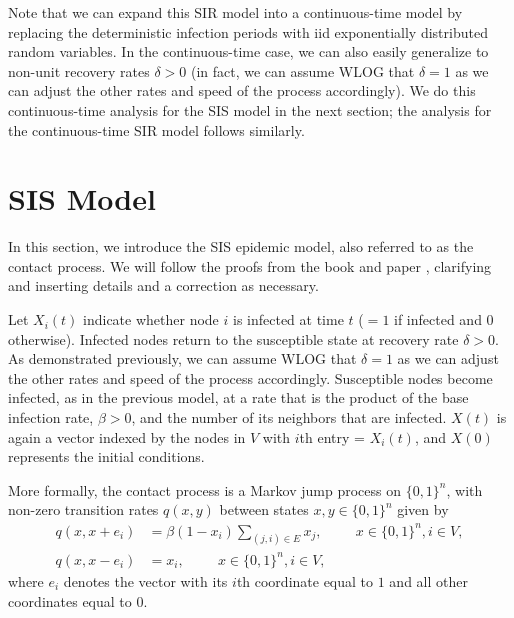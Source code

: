 \documentclass[11pt]{article}
\begin{document}

Note that we can expand this SIR model into a continuous-time model by replacing the deterministic infection periods with iid exponentially distributed random variables. In the continuous-time case, we can also easily generalize to non-unit recovery rates $\delta>0$ (in fact, we can assume WLOG that $\delta=1$ as we can adjust the other rates and speed of the process accordingly). We do this continuous-time analysis for the SIS model in the next section; the analysis for the continuous-time SIR model follows similarly.




\section{SIS Model} \label{sec:SIS}

In this section, we introduce the SIS epidemic model, also referred to as the contact process. We will follow the proofs from the book \cite{draief:epidemics} and paper \cite{ganesh:SIS_paper}, clarifying and inserting details and a correction as necessary.

Let $X_i(t)$ indicate whether node $i$ is infected at time $t$ ($=1$ if infected and 0 otherwise). Infected nodes return to the susceptible state at recovery rate $\delta>0$. As demonstrated previously, we can assume WLOG that $\delta=1$ as we can adjust the other rates and speed of the process accordingly. Susceptible nodes become infected, as in the previous model, at a rate that is the product of the base infection rate, $\beta>0$, and the number of its neighbors that are infected. $X(t)$ is again a vector indexed by the nodes in $V$ with $i$th entry = $X_i(t)$, and $X(0)$ represents the initial conditions.

More formally, the contact process is a Markov jump process on $\{0,1\}^n$, with non-zero transition rates $q(x,y)$ between states $x,y\in \{0,1\}^n$ given by
$$\begin{aligned}
q(x,x+e_i) &= \beta(1-x_i) \sum_{(j,i)\in E} x_j, \hspace{1cm} x\in \{0,1\}^n, i\in V, \\
q(x,x-e_i) &= x_i, \hspace{1cm} x\in \{0,1\}^n, i\in V,
\end{aligned}$$
where $e_i$ denotes the vector with its $i$th coordinate equal to $1$ and all other coordinates equal to $0$.
\end{document}

